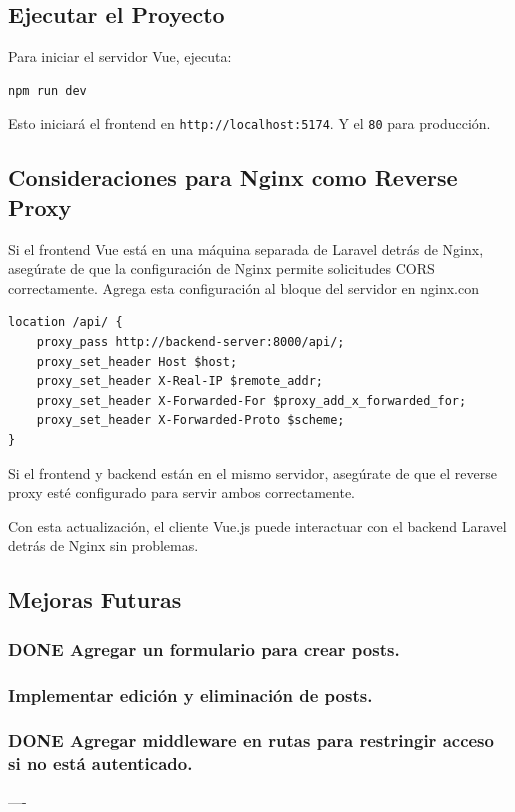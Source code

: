 \documentclass[11pt]{article}
\begin{document}
\subsection{Ejecutar el Proyecto}
\label{sec:org94fde5d}
Para iniciar el servidor Vue, ejecuta:

\begin{verbatim}
npm run dev
\end{verbatim}

Esto iniciará el frontend en \texttt{http://localhost:5174}.  Y el \texttt{80} para
 producción.

\subsection{Consideraciones para Nginx como Reverse Proxy}
\label{sec:orgdb0dc17}

Si el frontend Vue está en una máquina separada de Laravel detrás de
Nginx, asegúrate de que la configuración de Nginx permite solicitudes
CORS correctamente. Agrega esta configuración al bloque del servidor
en nginx.con
\begin{verbatim}
location /api/ {
    proxy_pass http://backend-server:8000/api/;
    proxy_set_header Host $host;
    proxy_set_header X-Real-IP $remote_addr;
    proxy_set_header X-Forwarded-For $proxy_add_x_forwarded_for;
    proxy_set_header X-Forwarded-Proto $scheme;
}
\end{verbatim}
Si el frontend y backend están en el mismo servidor, asegúrate de que
el reverse proxy esté configurado para servir ambos correctamente.

Con esta actualización, el cliente Vue.js puede interactuar con el
backend Laravel detrás de Nginx sin problemas.

\subsection{Mejoras Futuras}
\label{sec:org1353b10}
\subsubsection{{\bfseries\sffamily DONE} Agregar un formulario para crear posts.}
\label{sec:orgcebbb47}
\subsubsection{Implementar edición y eliminación de posts.}
\label{sec:org6e9c7c7}
\subsubsection{{\bfseries\sffamily DONE} Agregar middleware en rutas para restringir acceso si no está autenticado.}
\label{sec:org511eac6}
----
\end{document}
